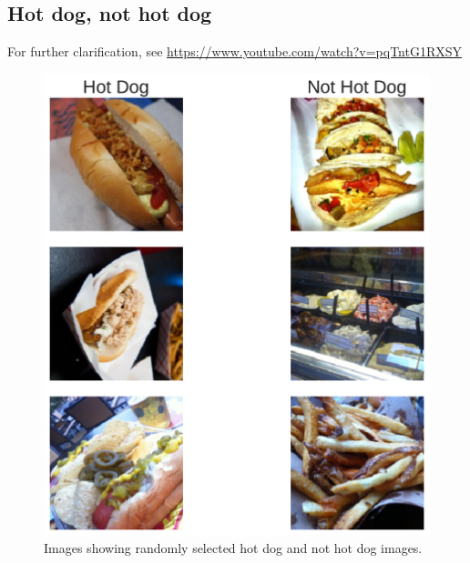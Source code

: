 \documentclass[10pt, twocolumn]{article}
\begin{document}
\onecolumn

\newpage
\begin{appendices}
\section{Hot dog, not hot dog}
For further clarification, see \url{https://www.youtube.com/watch?v=pqTntG1RXSY}
\begin{figure}[H]
    \centering
    \includegraphics[scale=0.4]{figs/hotdog_examples.pdf}
    \caption{Images showing randomly selected hot dog and not hot dog images.}
    \label{fig:hotdog_examples}
\end{figure}


\end{appendices}
\end{document}
